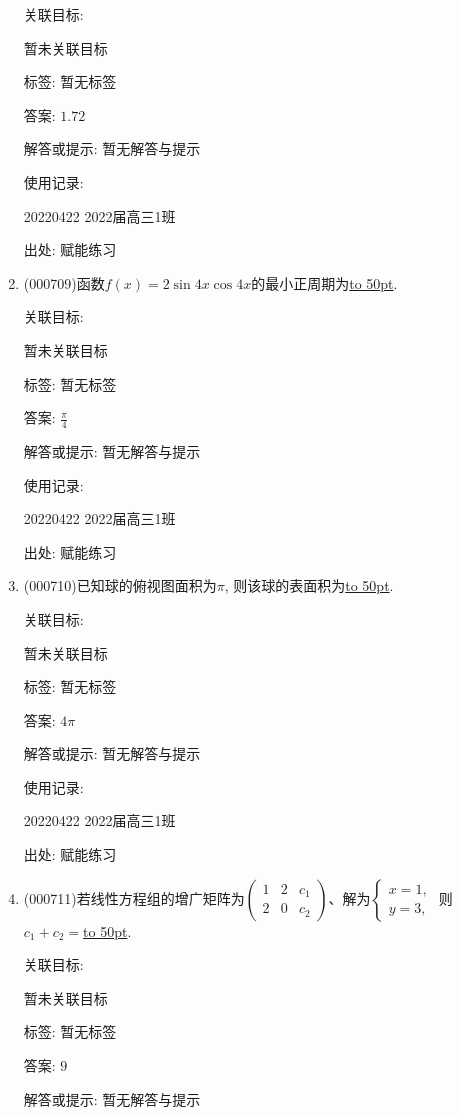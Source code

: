 \documentclass[10pt,a4paper]{article}
\newcommand{\blank}[1]{\underline{\hbox to #1pt{}}}
\begin{document}
\begin{enumerate}[1.]
关联目标:

暂未关联目标



标签: 暂无标签

答案: $1.72$

解答或提示: 暂无解答与提示

使用记录:

20220422	2022届高三1班	


出处: 赋能练习
\item { (000709)}函数$f(x)=2\sin 4x \cos 4x$的最小正周期为\blank{50}.


关联目标:

暂未关联目标



标签: 暂无标签

答案: $\frac{\pi }4$

解答或提示: 暂无解答与提示

使用记录:

20220422	2022届高三1班	


出处: 赋能练习
\item { (000710)}已知球的俯视图面积为$\pi$, 则该球的表面积为\blank{50}.


关联目标:

暂未关联目标



标签: 暂无标签

答案: $4\pi$

解答或提示: 暂无解答与提示

使用记录:

20220422	2022届高三1班	


出处: 赋能练习
\item { (000711)}若线性方程组的增广矩阵为$\begin{pmatrix} 1 & 2 & c_1 \\ 2 & 0 & c_2\end{pmatrix}$、解为$\begin{cases}x=1, \\ y=3,\end{cases}$ 则$c_1+c_2=$\blank{50}.


关联目标:

暂未关联目标



标签: 暂无标签

答案: $9$

解答或提示: 暂无解答与提示


\end{enumerate}
\end{document}
